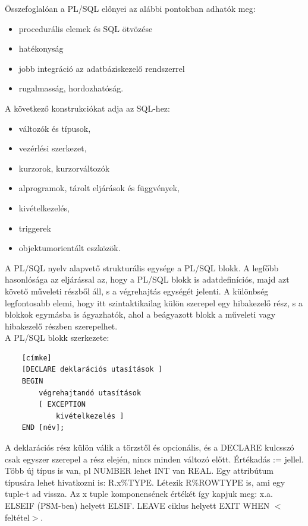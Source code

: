 \documentclass[tikz,12pt,margin=0px]{article}
\begin{document}
    \noindent Összefoglalóan a PL/SQL előnyei az alábbi pontokban adhatók meg:
    \begin{itemize}
	   \item procedurális elemek és SQL ötvözése
	   \item hatékonyság
	   \item jobb integráció az adatbáziskezelő rendszerrel
	   \item rugalmasság, hordozhatóság.
    \end{itemize}
\newpage
    \noindent A következő konstrukciókat adja az SQL-hez:
    \begin{itemize}
        \item változók és típusok,
        \item vezérlési szerkezet,
        \item kurzorok, kurzorváltozók
        \item alprogramok, tárolt eljárások és függvények,
        \item kivételkezelés,
        \item triggerek
        \item objektumorientált eszközök.
    \end{itemize}

    \noindent A PL/SQL nyelv alapvető strukturális egysége a PL/SQL blokk. A legfőbb hasonlósága az eljárással az, hogy a PL/SQL blokk is adatdefiníciós, majd azt követő műveleti részből áll, s a végrehajtás egységét jelenti. A különbség legfontosabb elemi, hogy itt szintaktikailag külön szerepel egy hibakezelő rész, s a blokkok egymásba is ágyazhatók, ahol a beágyazott blokk a műveleti vagy hibakezelő részben szerepelhet.\\
    \noindent A PL/SQL blokk szerkezete:

    \begin{verbatim}
    [címke]
    [DECLARE deklarációs utasítások ]
    BEGIN
        végrehajtandó utasítások
        [ EXCEPTION
            kivételkezelés ]
    END [név];
    \end{verbatim}

    \noindent A deklarációs rész külön válik a törzstől és opcionális, és a DECLARE kulcsszó csak egyszer szerepel a rész elején, nincs minden változó előtt. Értékadás := jellel.\\

    \noindent Több új típus is van, pl NUMBER lehet INT van REAL. Egy attribútum típusára lehet hivatkozni is: R.x\%TYPE. Létezik R\%ROWTYPE is,  ami egy tuple-t ad vissza. Az x tuple komponensének értékét így kapjuk meg: x.a.
    \noindent ELSEIF (PSM-ben) helyett ELSIF. LEAVE ciklus helyett EXIT WHEN $<$feltétel$>$.\\
\end{document}
